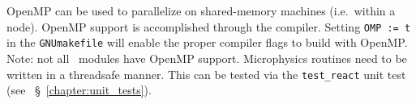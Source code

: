 OpenMP can be used to parallelize on shared-memory machines (i.e.\
within a node).  OpenMP support is accomplished through the compiler.
Setting {\tt OMP := t} in the {\tt GNUmakefile} will enable the proper
compiler flags to build with OpenMP.  Note: not all \maestroex\ modules 
have OpenMP support.  Microphysics routines need to be written in a
threadsafe manner.  This can be tested via the {\tt test\_react} unit
test (see ~\S~\ref{chapter:unit_tests}).

